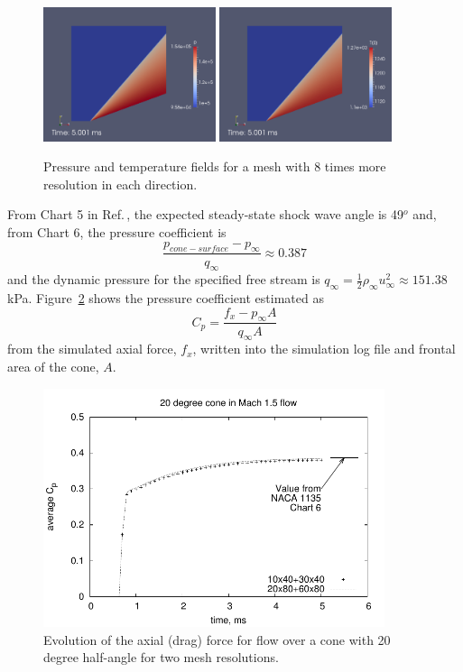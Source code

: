 \begin{figure}[htbp]
\begin{center}
\includegraphics[width=0.45\textwidth]{../2D/cone20-simple/cone20_p_factor-8-grid-res.png}
\includegraphics[width=0.45\textwidth]{../2D/cone20-simple/cone20_T0_factor-8-grid-res.png}
\end{center}
\caption{Pressure and temperature fields for a mesh with 8 times more resolution in each direction.}
\label{cone20-high-res-fig}
\end{figure}

\medskip
From Chart 5 in Ref.\,\cite{ames_53}, the expected steady-state shock wave
angle is 49$^o$ and, from Chart 6, the pressure coefficient is
$$
\frac{p_{cone-surface} - p_{\infty}}{q_{\infty}} \approx 0.387
$$
and the dynamic pressure for the specified free stream is
$q_{\infty} = \frac{1}{2} \rho_{\infty} u_{\infty}^2 \approx 151.38$\,kPa.
Figure~\ref{cone20-axial-force-fig} shows the pressure coefficient 
estimated as
$$
C_p = \frac{f_x - p_{\infty} A}{q_{\infty} A}
$$
from the simulated axial force, $f_x$, written into the simulation log file
and frontal area of the cone, $A$.

\begin{figure}[htbp]
\begin{center}
\includegraphics[width=10cm]{../2D/cone20-simple/cone20_cp.pdf}
\end{center}
\caption{Evolution of the axial (drag) force
         for flow over a cone with 20 degree half-angle
	 for two mesh resolutions.}
\label{cone20-axial-force-fig}
\end{figure}

